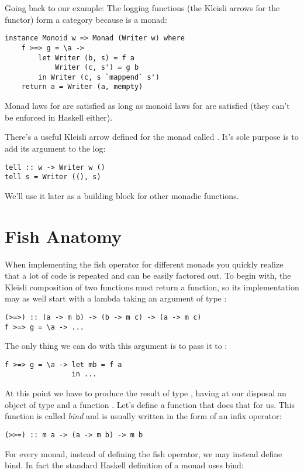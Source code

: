 Going back to our  example: The logging functions (the
Kleisli arrows for the  functor) form a category because
 is a monad:

\begin{verbatim}
instance Monoid w => Monad (Writer w) where
    f >=> g = \a ->
        let Writer (b, s) = f a
            Writer (c, s') = g b
        in Writer (c, s `mappend` s')
    return a = Writer (a, mempty)
\end{verbatim}
Monad laws for  are satisfied as long as monoid laws
for  are satisfied (they can't be enforced in Haskell either).

There's a useful Kleisli arrow defined for the  monad
called . It's sole purpose is to add its argument to the
log:

\begin{verbatim}
tell :: w -> Writer w ()
tell s = Writer ((), s)
\end{verbatim}
We'll use it later as a building block for other monadic functions.

\section{Fish Anatomy}\label{fish-anatomy}

When implementing the fish operator for different monads you quickly
realize that a lot of code is repeated and can be easily factored out.
To begin with, the Kleisli composition of two functions must return a
function, so its implementation may as well start with a lambda taking
an argument of type :

\begin{verbatim}
(>=>) :: (a -> m b) -> (b -> m c) -> (a -> m c)
f >=> g = \a -> ...
\end{verbatim}
The only thing we can do with this argument is to pass it to :

\begin{verbatim}
f >=> g = \a -> let mb = f a
                in ...
\end{verbatim}
At this point we have to produce the result of type ,
having at our disposal an object of type  and a function
. Let's define a function that
does that for us. This function is called \emph{bind} and is usually written in
the form of an infix operator:

\begin{verbatim}
(>>=) :: m a -> (a -> m b) -> m b
\end{verbatim}
For every monad, instead of defining the fish operator, we may instead
define bind. In fact the standard Haskell definition of a monad uses
bind:

